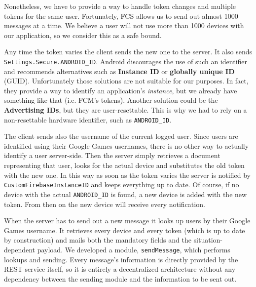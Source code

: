 Nonetheless, we have to provide a way to handle token changes and multiple
tokens for the same user. Fortunately, FCS allows us to send out almost 1000
messages at a time.
We believe a user will not use more than 1000 devices with our application,
so we consider this as a safe bound.

Any time the token varies the client sends the new one to the server.
It also sends \texttt{Settings.Secure.ANDROID\_ID}.
Android discourages the use of such an identifier and recommends
alternatives such as \textbf{Instance ID} or \textbf{globally unique ID} (GUID).
Unfortunately those solutions are not suitable for our purposes.
In fact, they provide a way to identify an application's \textit{instance}, but
we already have something like that (i.e. FCM's tokens).
Another solution could be the \textbf{Advertising IDs}, but they are
user-resettable.
This is why we had to rely on a non-resettable hardware identifier, such as
\texttt{ANDROID\_ID}.

The client sends also the username of the current logged user.
Since users are identified using their Google Games usernames, there is no
other way to actually identify a user server-side.
Then the server simply retrieves a document representing that user, looks for
the actual device and substitutes the old token with the new one.
In this way as soon as the token varies the server is notified by
\texttt{CustomFirebaseInstanceID} and keeps everything up to date.
Of course, if no device with the actual \texttt{ANDROID\_ID} is found, a new
device is added with the new token.
From then on the new device will receive every notification.

When the server has to send out a new message it looks up users by their
Google Games username.
It retrieves every device and every token (which is up to date by construction)
and mails both the mandatory fields and the situation-dependent payload.
We developed a module, \texttt{sendMessage}, which performs lookups and sending.
Every message's information is directly provided by the REST service itself,
so it is entirely a decentralized architecture without any dependency between
the sending module and the information to be sent out.
